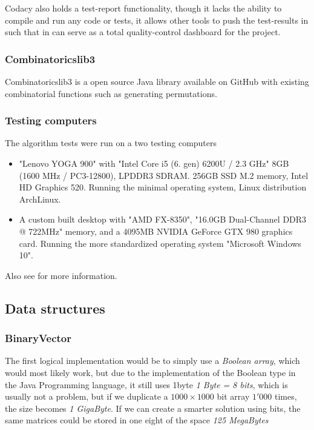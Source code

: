 \documentclass[a4paper]{article}
\begin{document}
Codacy also holds a test-report functionality, though it lacks the ability to compile
and run any code or tests, it allows other tools to push the test-results in such that
in can serve as a total quality-control dashboard for the project.

\subsubsection{Combinatoricslib3}
Combinatoricslib3 is a open source Java library available on GitHub with existing
combinatorial functions such as generating permutations.

\subsubsection{Testing computers}
\label{sec:computer}
The algorithm tests were run on a two testing computers
\begin{itemize}
    \item "Lenovo YOGA 900" with "Intel Core i5 (6. gen) 6200U / 2.3 GHz"
          8GB (1600 MHz / PC3-12800), LPDDR3 SDRAM. 256GB SSD M.2 memory, Intel HD Graphics 520.
          Running the minimal operating system, Linux distribution ArchLinux.
    \item A custom built desktop with "AMD FX-8350", "16.0GB Dual-Channel DDR3 @ 722MHz" memory, and a
          4095MB NVIDIA GeForce GTX 980 graphics card. Running the more standardized operating
          system "Microsoft Windows 10".
\end{itemize}

Also see  for more information.

\subsection{Data structures}
\subsubsection{BinaryVector}
The first logical implementation would be to simply use a \textit{Boolean array}, which would
most likely work, but due to the implementation of the Boolean type in the Java Programming language,
it still uses 1byte \textit{1 Byte = 8 bits}, which is usually not a problem, but if we duplicate
a $1000 \times 1000$ bit array $1'000$ times, the size becomes \textit{1 GigaByte}. If we can create
a smarter solution using bits, the same matrices could be stored in one eight of the space
\textit{125 MegaBytes}
\end{document}
